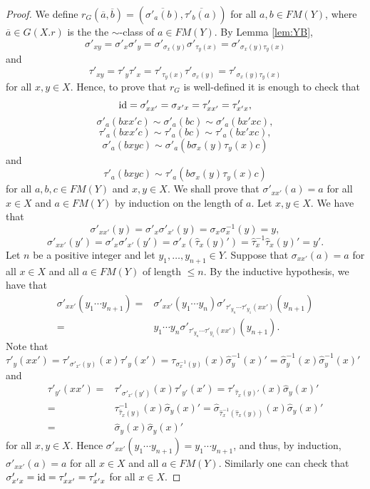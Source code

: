 \begin{proof}
We define $r_G(\overline{a},\overline{b})=(\overline{\sigma'_a(b)},\overline{\tau'_b(a)})$ for all $a,b\in FM(Y)$, where $\overline{a}\in G(X.r)$ is the the $\sim$-class of $a\in FM(Y)$. By Lemma \ref{lem:YB}, \[\sigma'_{xy}=\sigma'_{x}\sigma'_{y}=\sigma'_{\sigma_x(y)}\sigma'_{\tau_y(x)}=\sigma'_{\sigma_x(y)\tau_y(x)}\]
and
\[\tau'_{xy}=\tau'_{y}\tau'_{x}=\tau'_{\tau_y(x)}\tau'_{\sigma_x(y)}=\tau'_{\sigma_x(y)\tau_y(x)}\]
for all $x,y\in X$. Hence, to prove that $r_G$ is well-defined it is enough to check that \[\operatorname{id}=\sigma'_{xx'}=\sigma_{x'x}=\tau'_{xx'}=\tau'_{x'x},\] 
\[ \sigma'_{a}(bxx'c)\sim\sigma'_{a}(bc)\sim \sigma'_a(bx'xc),\]
\[ \tau'_{a}(bxx'c)\sim\tau'_{a}(bc)\sim \tau'_a(bx'xc),\]
\[\sigma'_{a}(bxyc)\sim \sigma'_a(b\sigma_x(y)\tau_y(x)c)\]
and 
\[\tau'_{a}(bxyc)\sim \tau'_a(b\sigma_x(y)\tau_y(x)c)\]
for all $a,b,c\in FM(Y)$ and $x,y\in X$.
We shall prove that $\sigma'_{xx'}(a)=a$ for all $x\in X$ and $a\in FM(Y)$ by induction on the length of $a$. Let $x,y\in X$. We have that
\[\sigma'_{xx'}(y)=\sigma'_x\sigma'_{x'}(y)=\sigma_x\sigma^{-1}_x(y)=y,\]
\[\sigma'_{xx'}(y')=\sigma'_x\sigma'_{x'}(y')=\sigma'_x(\widehat{\tau}_x(y)')=\widehat{\tau}^{-1}_x\widehat{\tau}_x(y)'=y'.\]
Let $n$ be a positive integer and let $y_1,\dots ,y_{n+1}\in Y$. Suppose that $\sigma_{xx'}(a)=a$ for all $x\in X$ and all $a\in FM(Y)$ of length $\leq n$. By the inductive hypothesis, we have that
\begin{align*}
    \sigma'_{xx'}(y_1\cdots y_{n+1})=&\sigma'_{xx'}(y_1\cdots y_n)\sigma'_{\tau'_{y_n}\cdots \tau'_{y_1}(xx')}(y_{n+1})\\
    =&y_1\cdots y_n\sigma'_{\tau'_{y_n}\cdots \tau'_{y_1}(xx')}(y_{n+1}).
\end{align*}
Note that $\tau'_{y}(xx')=\tau'_{\sigma'_{x'}(y)}(x)\tau'_y(x')=\tau_{\sigma^{-1}_x(y)}(x)\widehat{\sigma}_y^{-1}(x)'=\widehat{\sigma}_y^{-1}(x)\widehat{\sigma}_y^{-1}(x)'$ and
\begin{align*}\tau'_{y'}(xx')=&\tau'_{\sigma'_{x'}(y')}(x)\tau'_{y'}(x')
=\tau'_{\widehat{\tau}_x(y)'}(x)\widehat{\sigma}_y(x)'\\
=&\tau^{-1}_{\widehat{\tau}_x(y)}(x)\widehat{\sigma}_y(x)'=\widehat{\sigma}_{\widehat{\tau}^{-1}_x(\widehat{\tau}_x(y))}(x)\widehat{\sigma}_y(x)'\\
=&\widehat{\sigma}_y(x)\widehat{\sigma}_y(x)'
\end{align*} 
for all $x,y\in X$. Hence $\sigma'_{xx'}(y_1\cdots y_{n+1})=y_1\cdots y_{n+1}$, and thus, by induction, $\sigma'_{xx'}(a)=a$ for all $x\in X$ and all $a\in FM(Y)$. 
Similarly one can check that $\sigma'_{x'x}=\operatorname{id}=\tau'_{xx'}=\tau'_{x'x}$ for all $x\in X$. 


\end{proof}
